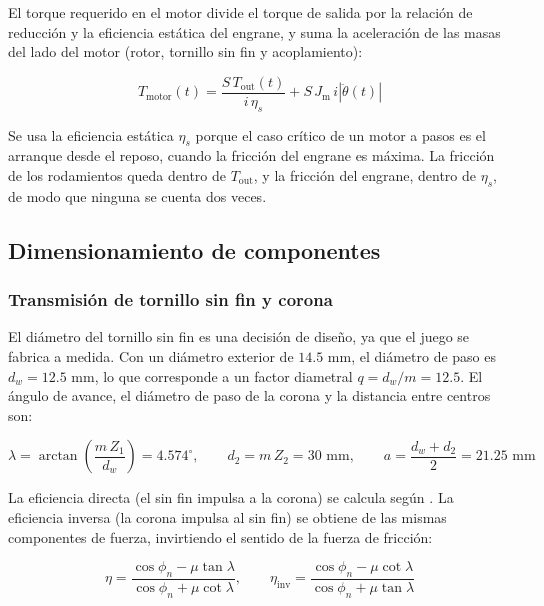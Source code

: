 \documentclass[../../General.tex]{subfiles}
\begin{document}
El torque requerido en el motor divide el torque de salida por la relación de reducción y la eficiencia estática del engrane, y suma la aceleración de las masas del lado del motor (rotor, tornillo sin fin y acoplamiento):

\begin{equation}\label{eq:Tmotor_tilt}
    T_{\text{motor}}(t) = \frac{S\, T_{\text{out}}(t)}{i\, \eta_s} + S\, J_{\text{m}}\, i \left|\ddot{\theta}(t)\right|
\end{equation}

Se usa la eficiencia estática $\eta_s$ porque el caso crítico de un motor a pasos es el arranque desde el reposo, cuando la fricción del engrane es máxima. La fricción de los rodamientos queda dentro de $T_{\text{out}}$, y la fricción del engrane, dentro de $\eta_s$, de modo que ninguna se cuenta dos veces.

\subsection{Dimensionamiento de componentes}

\subsubsection{Transmisión de tornillo sin fin y corona}

El diámetro del tornillo sin fin es una decisión de diseño, ya que el juego se fabrica a medida. Con un diámetro exterior de $14.5\text{ mm}$, el diámetro de paso es $d_w = 12.5\text{ mm}$, lo que corresponde a un factor diametral $q = d_w/m = 12.5$. El ángulo de avance, el diámetro de paso de la corona y la distancia entre centros son:

\begin{equation}\label{eq:geom_sinfin}
    \lambda = \arctan\!\left(\frac{m\, Z_1}{d_w}\right) = 4.574^\circ, \qquad d_2 = m\, Z_2 = 30\text{ mm}, \qquad a = \frac{d_w + d_2}{2} = 21.25\text{ mm}
\end{equation}

La eficiencia directa (el sin fin impulsa a la corona) se calcula según \citet{Shigley11th}. La eficiencia inversa (la corona impulsa al sin fin) se obtiene de las mismas componentes de fuerza, invirtiendo el sentido de la fuerza de fricción:

\begin{equation}\label{eq:eta_sinfin}
    \eta = \frac{\cos\phi_n - \mu \tan\lambda}{\cos\phi_n + \mu \cot\lambda}, \qquad
    \eta_{\text{inv}} = \frac{\cos\phi_n - \mu \cot\lambda}{\cos\phi_n + \mu \tan\lambda}
\end{equation}
\end{document}
